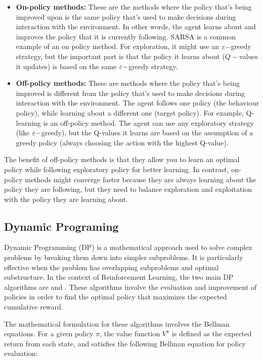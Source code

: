 \begin{itemize}
    \item \textbf{On-policy methods:} 
    These are the methods where the policy that's being improved upon is the same policy that's used to make decisions during interaction with the environment. In other words, the agent learns about and improves the policy that it is currently following. SARSA is a common example of an on policy method. For exploration, it might use an $\varepsilon-$greedy strategy, but the important part is that the policy it learns about ($Q-$values it updates) is based on the same $\varepsilon-$greedy strategy. 

    \item \textbf{Off-policy methods:} 
    These are methods where the policy that's being improved is different from the policy that's used to make decisions during interaction with the environment.
    The agent follows one policy (the behaviour policy), while learning about a different one (target policy). 
    For example, Q-learning is an off-policy method. The agent can use any exploratory strategy (like $\varepsilon-$greedy), but the Q-values it learns are based on the assumption of a greedy policy (always choosing the action with the highest Q-value). 
\end{itemize}
 The benefit of off-policy methods is that they allow you to learn an optimal policy while following exploratory policy for better learning. In contrast, on-policy methods might converge faster because they are always learning about the policy they are following, but they need to balance exploration and exploitation with the policy they are learning about. 

\subsection{Dynamic Programing}
Dynamic Programming (DP) is a mathematical approach used to solve complex problems by breaking them down into simpler subproblems. It is particularly effective when the problem has overlapping subproblems and optimal substructure. In the context of Reinforcement Learning, the two main DP algorithms are  and . These algorithms involve the evaluation and improvement of policies in order to find the optimal policy that maximizes the expected cumulative reward.


The mathematical formulation for these algorithms involves the Bellman equations. For a given policy $\pi$, the value function $V^\pi$ is defined as the expected return from each state, and satisfies the following Bellman equation for policy evaluation:

